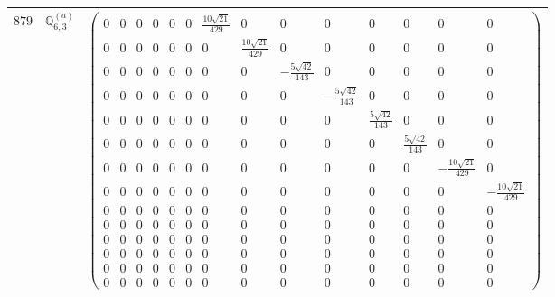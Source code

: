 \documentclass[fleqn,8pt,landscape]{jsarticle}
\begin{document}
\begin{center}
\begin{longtable}{ccc}
$ 879 $ & $ \mathbb{Q}_{6,3}^{(a)} $ & $ \begin{pmatrix} 0 & 0 & 0 & 0 & 0 & 0 & \frac{10 \sqrt{21}}{429} & 0 & 0 & 0 & 0 & 0 & 0 & 0 \\ 0 & 0 & 0 & 0 & 0 & 0 & 0 & \frac{10 \sqrt{21}}{429} & 0 & 0 & 0 & 0 & 0 & 0 \\ 0 & 0 & 0 & 0 & 0 & 0 & 0 & 0 & - \frac{5 \sqrt{42}}{143} & 0 & 0 & 0 & 0 & 0 \\ 0 & 0 & 0 & 0 & 0 & 0 & 0 & 0 & 0 & - \frac{5 \sqrt{42}}{143} & 0 & 0 & 0 & 0 \\ 0 & 0 & 0 & 0 & 0 & 0 & 0 & 0 & 0 & 0 & \frac{5 \sqrt{42}}{143} & 0 & 0 & 0 \\ 0 & 0 & 0 & 0 & 0 & 0 & 0 & 0 & 0 & 0 & 0 & \frac{5 \sqrt{42}}{143} & 0 & 0 \\ 0 & 0 & 0 & 0 & 0 & 0 & 0 & 0 & 0 & 0 & 0 & 0 & - \frac{10 \sqrt{21}}{429} & 0 \\ 0 & 0 & 0 & 0 & 0 & 0 & 0 & 0 & 0 & 0 & 0 & 0 & 0 & - \frac{10 \sqrt{21}}{429} \\ 0 & 0 & 0 & 0 & 0 & 0 & 0 & 0 & 0 & 0 & 0 & 0 & 0 & 0 \\ 0 & 0 & 0 & 0 & 0 & 0 & 0 & 0 & 0 & 0 & 0 & 0 & 0 & 0 \\ 0 & 0 & 0 & 0 & 0 & 0 & 0 & 0 & 0 & 0 & 0 & 0 & 0 & 0 \\ 0 & 0 & 0 & 0 & 0 & 0 & 0 & 0 & 0 & 0 & 0 & 0 & 0 & 0 \\ 0 & 0 & 0 & 0 & 0 & 0 & 0 & 0 & 0 & 0 & 0 & 0 & 0 & 0 \\ 0 & 0 & 0 & 0 & 0 & 0 & 0 & 0 & 0 & 0 & 0 & 0 & 0 & 0 \end{pmatrix} $ \\ \hline

\end{longtable}
\end{center}
\end{document}
